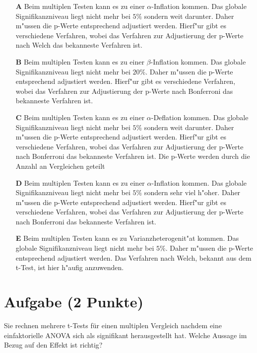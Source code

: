 \documentclass[a4paper, 9pt]{scrartcl}\usepackage[]{graphicx}\usepackage[]{xcolor}
\begin{document}
\begin{enumerate}
\item [\textbf{A} \msquare] Beim multiplen Testen kann es zu einer $\alpha$-Inflation kommen. Das globale Signifikanzniveau liegt nicht mehr bei $5\%$ sondern weit darunter. Daher m{"u}ssen die p-Werte entsprechend adjustiert werden. Hierf{"u}r gibt es verschiedene Verfahren, wobei das Verfahren zur Adjustierung der p-Werte nach Welch das bekanneste Verfahren ist.
\item [\textbf{B} \msquare] Beim multiplen Testen kann es zu einer $\beta$-Inflation kommen. Das globale Signifikanzniveau liegt nicht mehr bei $20\%$. Daher m{"u}ssen die p-Werte entsprechend adjustiert werden. Hierf{"u}r gibt es verschiedene Verfahren, wobei das Verfahren zur Adjustierung der p-Werte nach Bonferroni das bekanneste Verfahren ist.
\item [\textbf{C} \msquare] Beim multiplen Testen kann es zu einer $\alpha$-Deflation kommen. Das globale Signifikanzniveau liegt nicht mehr bei $5\%$ sondern weit darunter. Daher m{"u}ssen die p-Werte entsprechend adjustiert werden. Hierf{"u}r gibt es verschiedene Verfahren, wobei das Verfahren zur Adjustierung der p-Werte nach Bonferroni das bekanneste Verfahren ist. Die p-Werte werden durch die Anzahl an Vergleichen geteilt
\item [\textbf{D} \msquare] Beim multiplen Testen kann es zu einer $\alpha$-Inflation kommen. Das globale Signifikanzniveau liegt nicht mehr bei $5\%$ sondern sehr viel h{"o}her. Daher m{"u}ssen die p-Werte entsprechend adjustiert werden. Hierf{"u}r gibt es verschiedene Verfahren, wobei das Verfahren zur Adjustierung der p-Werte nach Bonferroni das bekanneste Verfahren ist.
\item [\textbf{E} \msquare] Beim multiplen Testen kann es zu Varianzheterogenit{"a}t kommen. Das globale Signifikanzniveau liegt nicht mehr bei $5\%$. Daher m{"u}ssen die p-Werte entsprechend adjustiert werden. Das Verfahren nach Welch, bekannt aus dem t-Test, ist hier h{"a}ufig anzuwenden.
\end{enumerate}

\section{Aufgabe \hfill (2 Punkte)}

Sie rechnen mehrere t-Tests f{\"u}r einen multiplen Vergleich nachdem eine
einfaktorielle ANOVA sich als signifikant herausgestellt hat. Welche
Aussage im Bezug auf den Effekt ist richtig? 
\end{document}

